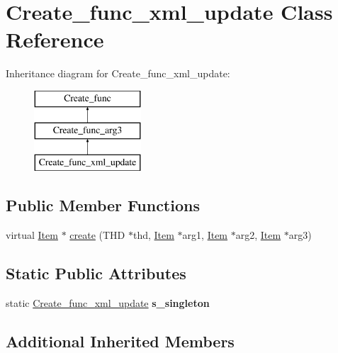 \hypertarget{classCreate__func__xml__update}{}\section{Create\+\_\+func\+\_\+xml\+\_\+update Class Reference}
\label{classCreate__func__xml__update}
Inheritance diagram for Create\+\_\+func\+\_\+xml\+\_\+update\+:\begin{figure}[H]
\begin{center}
\leavevmode
\includegraphics[height=3.000000cm]{classCreate__func__xml__update}
\end{center}
\end{figure}
\subsection*{Public Member Functions}
\begin{DoxyCompactItemize}
\item 
virtual \mbox{\hyperlink{classItem}{Item}} $\ast$ \mbox{\hyperlink{classCreate__func__xml__update_ac453f675f72445690a80fa3000465e1f}{create}} (T\+HD $\ast$thd, \mbox{\hyperlink{classItem}{Item}} $\ast$arg1, \mbox{\hyperlink{classItem}{Item}} $\ast$arg2, \mbox{\hyperlink{classItem}{Item}} $\ast$arg3)
\end{DoxyCompactItemize}
\subsection*{Static Public Attributes}
\begin{DoxyCompactItemize}
\item 
\mbox{\label{classCreate__func__xml__update_a7b98bdeb1d2b774b98ff98dde92591b0}} 
static \mbox{\hyperlink{classCreate__func__xml__update}{Create\+\_\+func\+\_\+xml\+\_\+update}} {\bfseries s\+\_\+singleton}
\end{DoxyCompactItemize}
\subsection*{Additional Inherited Members}


